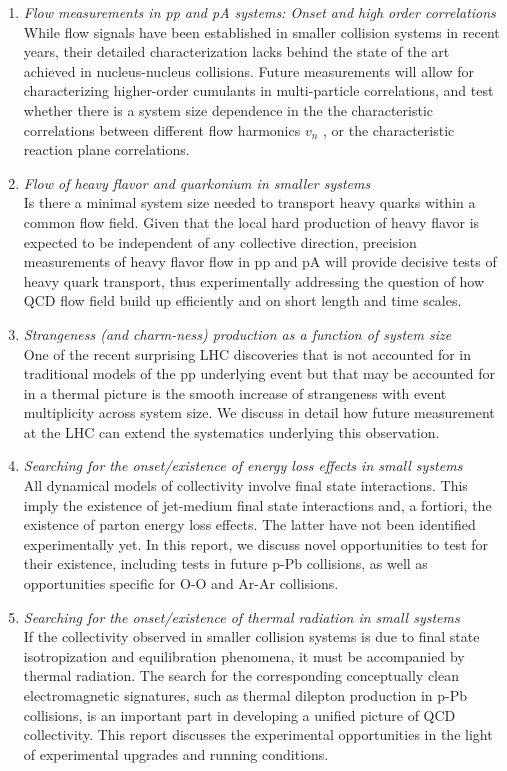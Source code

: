 \documentclass[../report.tex]{subfiles}
\begin{document}
\begin{enumerate}
\item {\it Flow measurements in pp and pA systems: Onset and high order correlations}\\ While flow signals have been established in smaller collision systems in recent years, their detailed characterization lacks behind the state of the art achieved in nucleus-nucleus collisions. Future measurements will allow for characterizing higher-order cumulants in multi-particle correlations, and test whether  there is a system size dependence in the the characteristic correlations between different flow harmonics $v_n$ , or the characteristic reaction plane correlations. 
\item {\it Flow of heavy flavor and quarkonium in smaller systems}\\  Is there a minimal system size needed to transport heavy quarks within a common flow field. Given that the local hard production of heavy flavor is expected to be independent of any collective direction, precision measurements of heavy flavor flow in pp and pA will provide decisive tests of heavy quark transport, thus experimentally addressing the question of how QCD flow field build up efficiently and on short length and time scales.
\item  {\it Strangeness (and charm-ness) production as a function of system size}\\ One of the recent surprising LHC discoveries that is not accounted for in traditional models of the pp underlying event but that may be accounted for in a thermal picture is the smooth increase of strangeness with event multiplicity across system size. We discuss in detail how future measurement at the LHC can extend the systematics underlying this observation.
\item {\it Searching for the onset/existence of energy loss effects in small systems}\\ All dynamical models of collectivity involve final state interactions. This imply the existence of jet-medium final state interactions and, a fortiori, the existence of parton energy loss effects. The latter have not been identified experimentally yet. In this report, we discuss novel opportunities to test for their existence, including tests in future p-Pb collisions, as well as opportunities specific for O-O and Ar-Ar collisions.
\item {\it Searching for the onset/existence of thermal radiation in small systems}\\ If the collectivity observed in smaller collision systems is due to final state isotropization and equilibration phenomena, it must be accompanied by thermal radiation. The search for the corresponding conceptually clean electromagnetic signatures, such as thermal dilepton production in p-Pb collisions, is an important part in developing a unified  picture of QCD collectivity. This report discusses the experimental opportunities in the light of experimental upgrades and running conditions.   
\end{enumerate}
\end{document}
